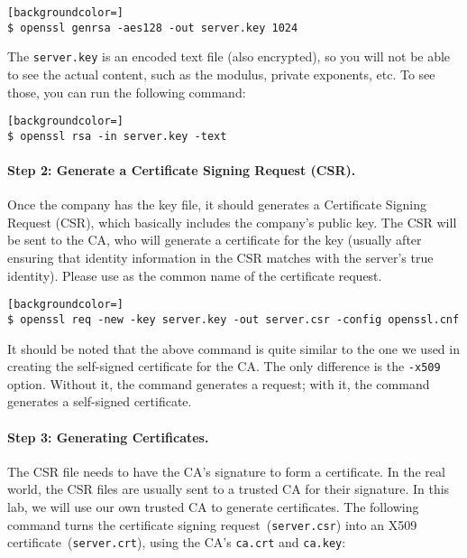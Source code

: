 \begin{lstlisting}[backgroundcolor=]
$ openssl genrsa -aes128 -out server.key 1024
\end{lstlisting}

The \texttt{server.key} is an encoded text file (also encrypted), 
so you will not be able to see the actual content, such as the modulus, private exponents, etc. To see
those, you can run the following command:

\begin{lstlisting}[backgroundcolor=]
$ openssl rsa -in server.key -text
\end{lstlisting}



\paragraph{Step 2: Generate a Certificate Signing Request (CSR).}
Once the company has the key file, it should generates a Certificate Signing Request (CSR), 
which basically includes the company's public key. 
The CSR will be sent to the CA, who will generate a certificate 
for the key (usually after ensuring that identity information in 
the CSR matches with the server's true identity). Please 
use \pkiserver as the common name of the certificate 
request.

\begin{lstlisting}[backgroundcolor=]
$ openssl req -new -key server.key -out server.csr -config openssl.cnf
\end{lstlisting}


It should be noted that the above command is quite similar to the one
we used in creating the self-signed certificate for the CA. The only
difference is the {\tt -x509} option. Without it, the command 
generates a request; with it, the command generates a self-signed 
certificate.


\paragraph{Step 3: Generating Certificates.}
The CSR file needs to have the CA's signature to form a certificate. In 
the real world, the CSR files are usually sent to a trusted CA for their 
signature. In this lab, we will use our own trusted CA 
to generate certificates. The following command turns the 
certificate signing request~({\tt server.csr}) into 
an X509 certificate~({\tt server.crt}), using the CA's
{\tt ca.crt} and {\tt ca.key}:

